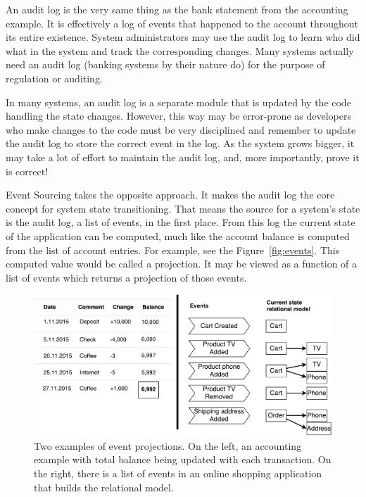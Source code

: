 \documentclass{book}
\begin{document}
An audit log is the very same thing as the bank statement from the
accounting example. It is effectively a log of events that happened to
the account throughout its entire existence. System administrators may
use the audit log to learn who did what in the system and track the
corresponding changes. Many systems actually need an audit log (banking
systems by their nature do) for the purpose of regulation or auditing.

In many systems, an audit log is a separate module that is updated by
the code handling the state changes. However, this way may be
error-prone as developers who make changes to the code must be very
disciplined and remember to update the audit log to store the correct
event in the log. As the system grows bigger, it may take a lot of
effort to maintain the audit log, and, more importantly, prove it is
correct!

Event Sourcing takes the opposite approach. It makes the audit log the
core concept for system state transitioning. That means the source for a
system's state is the audit log, a list of events, in the first place.
From this log the current state of the application can be computed, much
like the account balance is computed from the list of account entries.
For example, see the Figure~\ref{fig:events}. This computed value would
be called a projection. It may be viewed as a function of a list of
events which returns a projection of those events.


\begin{figure}[h!]
\begin{center}
\includegraphics[width=0.98\columnwidth]{figures/events/events}
\caption{Two examples of event projections. On the left, an accounting example
with total balance being updated with each transaction. On the right,
there is a list of events in an online shopping application that builds
the relational model.%
}
\end{center}
\end{figure}
\end{document}
